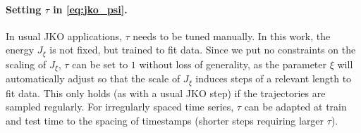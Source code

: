 
\paragraph{Setting $\tau$ in \eqref{eq:jko_psi}.} 
In usual \acrshort{JKO} applications, $\tau$ needs to be tuned manually. In this work, the energy $J_\xi$ is not fixed, but trained to fit data. Since we put no constraints on the scaling of $J_\xi$, $\tau$ can be set to $1$ without loss of generality, as the parameter $\xi$ will automatically adjust so that the scale of $J_\xi$ induces steps of a relevant length to fit data. This only holds (as with a usual \acrshort{JKO} step) if the trajectories are sampled regularly. For irregularly spaced time series, $\tau$ can be adapted at train and test time to the spacing of timestamps (shorter steps requiring larger $\tau$).


\begin{table}[t]
    \caption{Evaluation of predictive performance w.r.t. the entropy-regularized Wasserstein distance $W_\varepsilon$ \eqref{eq:reg-ot} of \textsc{JKOnet} and the forward method on the embryoid body scRNA-seq data per time step (using 3 runs).}
    \label{tab:exp_jkonet_cell_pred}
    \centering
{}
\end{table}

